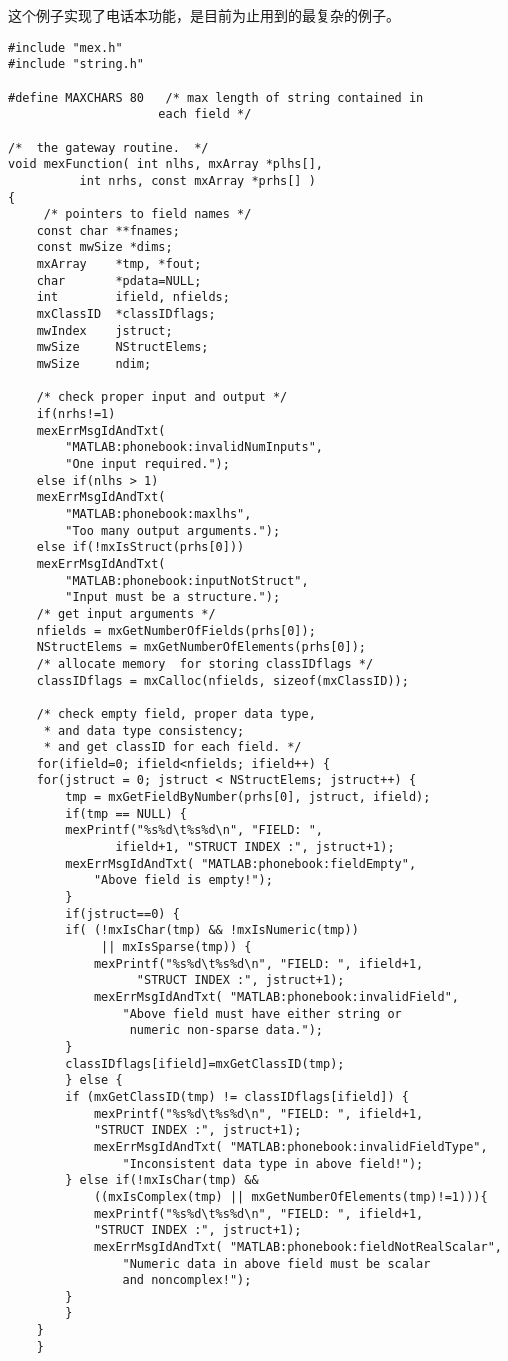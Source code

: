 \documentclass[10pt,a4paper,UTF8]{article}
\begin{document}
这个例子实现了电话本功能，是目前为止用到的最复杂的例子。
\lstset{language=C,label= ,caption= ,captionpos=b,numbers=left}
\begin{lstlisting}
#include "mex.h"
#include "string.h"

#define MAXCHARS 80   /* max length of string contained in
					 each field */

/*  the gateway routine.  */
void mexFunction( int nlhs, mxArray *plhs[],
		  int nrhs, const mxArray *prhs[] )
{
     /* pointers to field names */
    const char **fnames;
    const mwSize *dims;
    mxArray    *tmp, *fout;
    char       *pdata=NULL;
    int        ifield, nfields;
    mxClassID  *classIDflags;
    mwIndex    jstruct;
    mwSize     NStructElems;
    mwSize     ndim;

    /* check proper input and output */
    if(nrhs!=1)
	mexErrMsgIdAndTxt(
		"MATLAB:phonebook:invalidNumInputs",
		"One input required.");
    else if(nlhs > 1)
	mexErrMsgIdAndTxt(
		"MATLAB:phonebook:maxlhs",
		"Too many output arguments.");
    else if(!mxIsStruct(prhs[0]))
	mexErrMsgIdAndTxt(
		"MATLAB:phonebook:inputNotStruct",
		"Input must be a structure.");
    /* get input arguments */
    nfields = mxGetNumberOfFields(prhs[0]);
    NStructElems = mxGetNumberOfElements(prhs[0]);
    /* allocate memory  for storing classIDflags */
    classIDflags = mxCalloc(nfields, sizeof(mxClassID));

    /* check empty field, proper data type,
     * and data type consistency;
     * and get classID for each field. */
    for(ifield=0; ifield<nfields; ifield++) {
	for(jstruct = 0; jstruct < NStructElems; jstruct++) {
	    tmp = mxGetFieldByNumber(prhs[0], jstruct, ifield);
	    if(tmp == NULL) {
		mexPrintf("%s%d\t%s%d\n", "FIELD: ",
			   ifield+1, "STRUCT INDEX :", jstruct+1);
		mexErrMsgIdAndTxt( "MATLAB:phonebook:fieldEmpty",
			"Above field is empty!");
	    }
	    if(jstruct==0) {
		if( (!mxIsChar(tmp) && !mxIsNumeric(tmp))
		     || mxIsSparse(tmp)) {
		    mexPrintf("%s%d\t%s%d\n", "FIELD: ", ifield+1,
			      "STRUCT INDEX :", jstruct+1);
		    mexErrMsgIdAndTxt( "MATLAB:phonebook:invalidField",
			    "Above field must have either string or
			     numeric non-sparse data.");
		}
		classIDflags[ifield]=mxGetClassID(tmp);
	    } else {
		if (mxGetClassID(tmp) != classIDflags[ifield]) {
		    mexPrintf("%s%d\t%s%d\n", "FIELD: ", ifield+1,
		    "STRUCT INDEX :", jstruct+1);
		    mexErrMsgIdAndTxt( "MATLAB:phonebook:invalidFieldType",
			    "Inconsistent data type in above field!");
		} else if(!mxIsChar(tmp) &&
			((mxIsComplex(tmp) || mxGetNumberOfElements(tmp)!=1))){
		    mexPrintf("%s%d\t%s%d\n", "FIELD: ", ifield+1,
		    "STRUCT INDEX :", jstruct+1);
		    mexErrMsgIdAndTxt( "MATLAB:phonebook:fieldNotRealScalar",
			    "Numeric data in above field must be scalar
			    and noncomplex!");
		}
	    }
	}
    }


\end{lstlisting}
\end{document}

